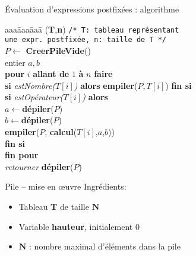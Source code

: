 \begin{frame}{Évaluation d'expressions postfixées : algorithme}
  \begin{tabbing}
    aaa\=aaa\=aaa\=\kill
    (\textbf{T},\textbf{n}) \texttt{/* T: tableau représentant } \\
    \> \>   \texttt{une expr. postfixée, n: taille de T */} \\
    \> $P \leftarrow$ \textbf{CreerPileVide}() \\
    \> entier $a,b$ \\
    \> \textbf{pour} $i$  \textbf{allant de} $1$ \textbf{à} $n$ \textbf{faire} \\
    \> \> \textbf{si} \emph{estNombre($T[i]$)} \textbf{alors} \textbf{empiler}($P,T[i]$) \textbf{fin si} \\
    \> \> \textbf{si} \emph{estOpérateur($T[i]$)} \textbf{alors} \\
    \> \> \> $a \leftarrow $\textbf{dépiler}($P$) \\
    \> \> \> $b \leftarrow $\textbf{dépiler}($P$) \\
    \> \> \> \textbf{empiler}($P$, \textbf{calcul}($T[i]$,$a$,$b$)) \\
    \> \> \textbf{fin si} \\
    \> \textbf{fin pour}\\
    \> \textsl{retourner} \textbf{dépiler}($P$)
  \end{tabbing}
\end{frame}

\begin{frame}{Pile -- mise en {\oe}uvre}
  Ingrédients:
  \begin{itemize}
  \item<1-> Tableau \textbf{T} de taille $\mathbf{N}$
  \item<2-> Variable \textbf{hauteur}, initialement $0$
  \item<3-> $\mathbf{N}$ : nombre maximal d'éléments dans la pile
  \end{itemize}
  
\end{frame}

